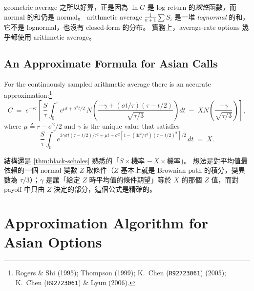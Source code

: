 \begin{note}
	geometric average 之所以好算，正是因為 $\ln G$ 是 log return 的\emph{線性}函數，而 normal 的和仍是 normal。
	arithmetic average $\frac1{n+1}\sum S_{i}$ 是一堆 \emph{lognormal} 的和，它不是 lognormal，也沒有 closed-form 的分布。
	實務上，average-rate options 幾乎都使用 arithmetic average。
\end{note}
\suppend

\subsection{An Approximate Formula for Asian Calls}


For the continuously sampled arithmetic average there is an accurate approximation:\footnote{Rogers \& Shi (1995); Thompson (1999); K.~Chen (\texttt{R92723061}) (2005); K.~Chen (\texttt{R92723061}) \& Lyuu (2006).}
\[
	C \;=\; e^{-r\tau}\left[\,\frac{S}{\tau}\int_{0}^{\tau}e^{\mu t+\sigma^{2}t/2}\,N\!\left(\frac{-\gamma+(\sigma t/\tau)(\tau-t/2)}{\sqrt{\tau/3}}\right)dt
		\;-\;XN\!\left(\frac{-\gamma}{\sqrt{\tau/3}}\right)\right] ,
\]
where $\mu\triangleq r-\sigma^{2}/2$ and $\gamma$ is the unique value that satisfies
\[
	\frac{S}{\tau}\int_{0}^{\tau}e^{3\gamma\sigma t(\tau-t/2)/\tau^{2}+\mu t+\sigma^{2}[\,t-(3t^{2}/\tau^{3})(\tau-t/2)^{2}\,]/2}\,dt \;=\; X .
\]

\suppstart
{}

\begin{note}
	結構還是 \autoref{thm:black-scholes} 熟悉的「$S\times$機率 $-\,X\times$機率」。
	想法是對平均值最依賴的一個 normal 變數 $Z$ 取條件（$Z$ 基本上就是 Brownian path 的積分，變異數為 $\tau/3$）；$\gamma$ 是讓「給定 $Z$ 時平均值的條件期望」等於 $X$ 的那個 $Z$ 值，而對 payoff 中只由 $Z$ 決定的部分，這個公式是精確的。
\end{note}
\suppend

\section{Approximation Algorithm for Asian Options}
\label{sec:asian-algorithm}



